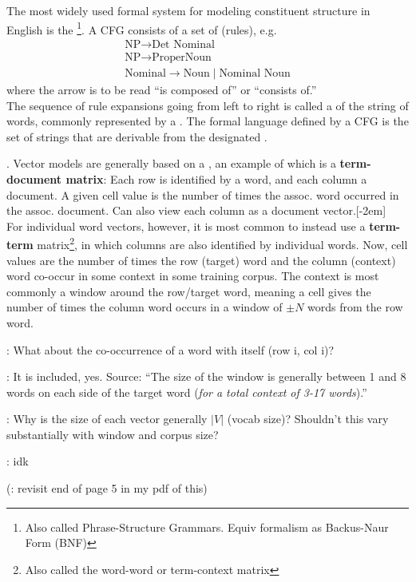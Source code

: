 \documentclass[11pt]{article}
\newcommand\myspace[1][]{\vspace{#1\bigskipamount}}
\newcommand\p{\Needspace{10\baselineskip} \noindent}
\newcommand\QA[2]{\item \red{Q}: #1
	\begin{compactitem}
		\item \green{A}: #2
	\end{compactitem}}
\begin{document}
\p The most widely used formal system for modeling constituent structure in English is the \footnote{Also called Phrase-Structure Grammars. Equiv formalism as Backus-Naur Form (BNF)}. A CFG consists of a set of  (rules), e.g. 
\begin{align}
	\text{NP} \longrightarrow \text{Det Nominal} \\
	\text{NP} \longrightarrow \text{ProperNoun} \\
	\text{Nominal} \longrightarrow \text{Noun} \mid \text{Nominal Noun}
\end{align}
where the arrow is to be read ``is composed of'' or ``consists of.'' \\

\p The sequence of rule expansions going from left to right is called a  of the string of words, commonly represented by a . The formal language defined by a CFG is the set of strings that are derivable from the designated . 









\myspace
\p {}. Vector models are generally based on a , an example of which is a \textbf{term-document matrix}: Each row is identified by a word, and each column a document. A given cell value is the number of times the assoc. word occurred in the assoc. document. Can also view each column as a document vector.[-2em] \\

\p For individual word vectors, however, it is most common to instead use a \textbf{term-term} matrix\footnote{Also called the word-word or term-context matrix}, in which columns are also identified by individual words. Now, cell values are the number of times the row (target) word and the column (context) word co-occur in some context in some training corpus. The context is most commonly a window around the row/target word, meaning a cell gives the number of times the column word occurs in a window of $\pm N$ words from the row word. 
\begin{compactitem}
	\QA{What about the co-occurrence of a word with itself (row i, col i)?}{It is included, yes. Source: ``The size of the window \textellipsis is generally between 1 and 8 words on each side of the target word (\textit{for a total context of 3-17 words}).''}
	
	\QA{ Why is the size of each vector generally $|V|$ (vocab size)? Shouldn't this vary substantially with window and corpus size?}{idk}
\end{compactitem}
(: revisit end of page 5 in my pdf of this)
\end{document}
